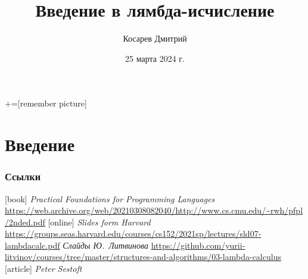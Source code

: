 \documentclass[aspectratio=169
  , xcolor={svgnames}
  , hyperref=
      { colorlinks
      , urlcolor=DarkBlue
      }
  , russian  %
  ]{beamer}
\title[Введение в лямбда-исчисление]{Введение в лямбда-исчисление}
\author{Косарев Дмитрий}
\date{25 марта 2024 г.}
\begin{document}
\maketitle

+=[remember picture]

\everymath{\displaystyle}





\section*{Введение}


\begin{frame}%
\frametitle<presentation>{Ссылки}
\begin{thebibliography}{10}
[book]
      {\em Practical Foundations for Programming Languages}
      \newblock\url{https://web.archive.org/web/20210308082040/http://www.cs.cmu.edu/~rwh/pfpl/2nded.pdf}
[online]
      {\em Slides form Harvard}
      \newblock\url{https://groups.seas.harvard.edu/courses/cs152/2021sp/lectures/sld07-lambdacalc.pdf}
      {\em Слайды Ю.~Литвинова} \newblock\url{https://github.com/yurii-litvinov/courses/tree/master/structures-and-algorithms/03-lambda-calculus}
[article]
      {\em Peter Sestoft}

\end{thebibliography}
\end{frame}


%
\end{document}
